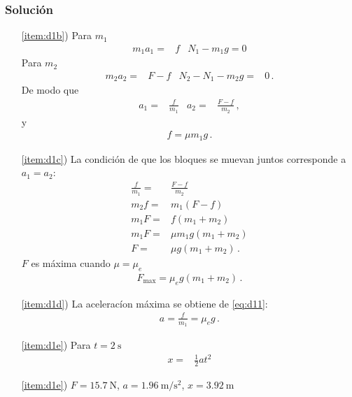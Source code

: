 \subsubsection*{Solución}
  \begin{itemize}
  \item[\ref{item:d1b})] Para $m_1$
    \begin{align}
      \label{eq:d11}
      m_1 a_1=&f & N_1-m_1 g=0
    \end{align}
Para $m_2$
\begin{align*}
  m_2 a_2=&F-f & N_2-N_1-m_2g=&0\,.
\end{align*}
    De modo que
    \begin{align*}
      a_1=&\frac{f}{m_1}& a_2=&\frac{F-f}{m_2}\,,
    \end{align*}
    y
    \begin{align*}
      f=\mu m_1 g\,.
    \end{align*}
  \item[\ref{item:d1c})]
    La condición de que los bloques se muevan juntos corresponde a $a_1=a_2$:
    \begin{align*}
      \frac{f}{m_1}=&\frac{F-f}{m_2}\\
      m_2 f =&m_1(F-f)\\
      m_1F =&f(m_1+m_2)\\
      m_1F =&\mu m_1 g(m_1+m_2)\\
      F =&\mu g(m_1+m_2)\,. 
    \end{align*}
    $F$ es máxima cuando $\mu=\mu_e$
    \begin{align*}
      F_{\text{max}}=\mu_e g(m_1+m_2)\,. 
    \end{align*}

    \item[\ref{item:d1d})] La aceleracíon máxima se obtiene de \eqref{eq:d11}:
      \begin{align*}
        a=\frac{f}{m_1}=\mu_e g\,.
      \end{align*}
    \item[\ref{item:d1e})] Para $t=\SI{2}{\second}$
      \begin{align*}
        x=&\frac{1}{2}a t^2
      \end{align*}
    \item[\ref{item:d1e})] $F=\SI{15.7}{\newton}$, $a=\SI{1.96}{\meter\per\second^2}$, $x=\SI{3.92}{\meter}$ \finejemplo

    \end{itemize}

